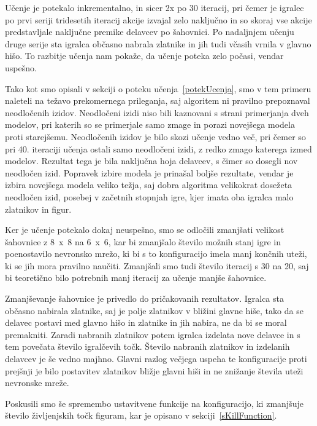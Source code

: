 \documentclass[a4paper, 12pt]{book}
\begin{document}
{Učenje je potekalo inkrementalno, in sicer 2x po 30 iteracij, pri čemer je igralec po prvi seriji tridesetih iteracij akcije izvajal zelo naključno in so skoraj vse akcije predstavljale naključne premike delavcev po šahovnici.
Po nadaljnjem učenju druge serije sta igralca občasno nabrala zlatnike in jih tudi včasih vrnila v glavno hišo.
To razbitje učenja nam pokaže, da učenje poteka zelo počasi, vendar uspešno.

Tako kot smo opisali v sekciji o poteku učenja~\ref{potekUcenja}, smo v tem primeru naleteli na težavo prekomernega prileganja, saj algoritem ni pravilno prepoznaval neodločenih izidov.
Neodločeni izidi niso bili kaznovani s strani primerjanja dveh modelov, pri katerih so se primerjale samo zmage in porazi novejšega modela proti starejšemu.
Neodločenih izidov je bilo skozi učenje vedno več, pri čemer so pri 40. iteraciji učenja ostali samo neodločeni izidi, z redko zmago katerega izmed modelov.
Rezultat tega je bila naključna hoja delavcev, s čimer so dosegli nov neodločen izid.
Popravek izbire modela je prinašal boljše rezultate, vendar je izbira novejšega modela veliko težja, saj dobra algoritma velikokrat dosežeta neodločen izid, posebej v začetnih stopnjah igre, kjer imata oba igralca malo zlatnikov in figur.

Ker je učenje potekalo dokaj neuspešno, smo se odločili zmanjšati velikost šahovnice z 8~x~8 na 6~x~6, kar bi zmanjšalo število možnih stanj igre in poenostavilo nevronsko mrežo, ki bi s to konfiguracijo imela manj končnih uteži, ki se jih mora pravilno naučiti.
Zmanjšali smo tudi število iteracij s 30 na 20, saj bi teoretično bilo potrebnih manj iteracij za učenje manjše šahovnice.

Zmanjševanje šahovnice je privedlo do pričakovanih rezultatov.
Igralca sta občasno nabirala zlatnike, saj je polje zlatnikov v bližini glavne hiše, tako da se delavec postavi med glavno hišo in zlatnike in jih nabira, ne da bi se moral premakniti.
Zaradi nabranih zlatnikov potem igralca izdelata nove delavce in s tem povečata število igralčevih točk.
Število nabranih zlatnikov in izdelanih delavcev je še vedno majhno.
Glavni razlog večjega uspeha te konfiguracije proti prejšnji je bilo postavitev zlatnikov bližje glavni hiši in ne znižanje števila uteži nevronske mreže.


Poskusili smo še spremembo ustavitvene funkcije na konfiguracijo, ki zmanjšuje število življenjskih točk figuram, kar je opisano v sekciji~\ref{sKillFunction}.

}
\end{document}
